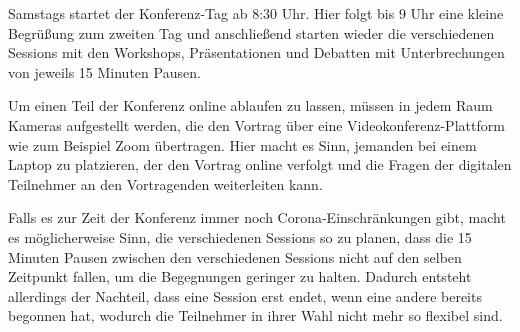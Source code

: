 Samstags startet der Konferenz-Tag ab 8:30 Uhr. Hier folgt bis 9 Uhr eine kleine Begrüßung zum zweiten Tag und anschließend starten wieder die verschiedenen Sessions mit den Workshops, Präsentationen und Debatten mit Unterbrechungen von jeweils 15 Minuten Pausen. 

Um einen Teil der Konferenz online ablaufen zu lassen, müssen in jedem Raum Kameras aufgestellt werden, die den Vortrag über eine Videokonferenz-Plattform wie zum Beispiel Zoom übertragen. Hier macht es Sinn, jemanden bei einem Laptop zu platzieren, der den Vortrag online verfolgt und die Fragen der digitalen Teilnehmer an den Vortragenden weiterleiten kann.
 
Falls es zur Zeit der Konferenz immer noch Corona-Einschränkungen gibt, macht es möglicherweise Sinn, die verschiedenen Sessions so zu planen, dass die 15 Minuten Pausen zwischen den verschiedenen Sessions nicht auf den selben Zeitpunkt fallen, um die Begegnungen geringer zu halten. Dadurch entsteht allerdings der Nachteil, dass eine Session erst endet, wenn eine andere bereits begonnen hat, wodurch die Teilnehmer in ihrer Wahl nicht mehr so flexibel sind.

